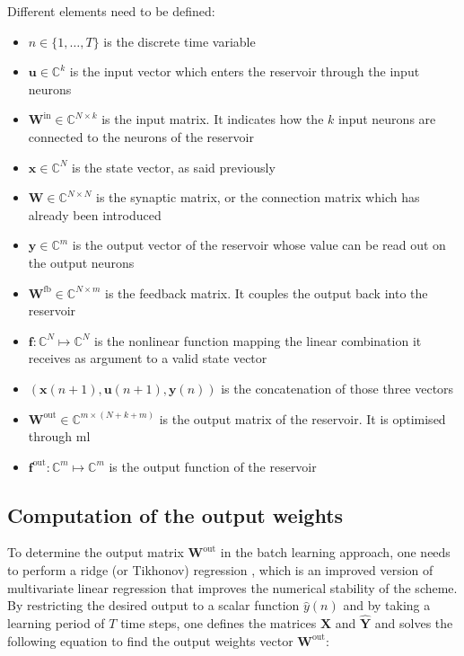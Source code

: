 Different elements need to be defined: 

\begin{itemize}
	\item $n \in \{1, \dots, T\}$ is the discrete time variable
	\item $\mathbf{u} \in \mathbb{C}^k$ is the input vector which enters the reservoir through the input neurons
	\item $\mathbf{W}^{\text{in}} \in \mathbb{C}^{N \times k}$ is the input matrix. It indicates how the $k$ input neurons are connected to the neurons of the reservoir
	\item $\mathbf{x} \in \mathbb{C}^{N}$ is the state vector, as said previously
	\item $\mathbf{W} \in \mathbb{C}^{N \times N}$ is the synaptic matrix, or the connection matrix which has already been introduced
	\item $\mathbf{y} \in \mathbb{C}^{m}$ is the output vector of the reservoir whose value can be read out on the output neurons
	\item $\mathbf{W}^{\text{fb}} \in \mathbb{C}^{N \times m}$ is the feedback matrix. It couples the output back into the reservoir
	\item $\mathbf{f}: \mathbb{C}^N \mapsto \mathbb{C}^N$ is the nonlinear function mapping the linear combination it receives as argument to a valid state vector
	\item $\left(\mathbf{x}(n+1), \mathbf{u}(n+1), \mathbf{y}(n)\right)$ is the concatenation of those three vectors
	\item $\mathbf{W}^{\text{out}} \in \mathbb{C}^{m \times (N+k+m)}$ is the output matrix of the reservoir. It is optimised through \gls{ml}
	\item $\mathbf{f}^{\text{out}} : \mathbb{C}^{m} \mapsto \mathbb{C}^{m}$ is the output function of the reservoir
\end{itemize}


\subsection{Computation of the output weights}

To determine the output matrix $\mathbf{W}^{\text{out}}$ in the batch learning approach, one needs to perform a ridge (or Tikhonov) regression \cite{NIPS2010_4056}, which is an improved version of multivariate linear regression that improves the numerical stability of the scheme. By restricting the desired output to a scalar function $\hat{y}(n)$ and by taking a learning period of $T$ time steps, one defines the matrices $\mathbf{X}$ and $\hat{\mathbf{Y}}$ and solves the following equation to find the output weights vector $\mathbf{W}^{\text{out}}$:


